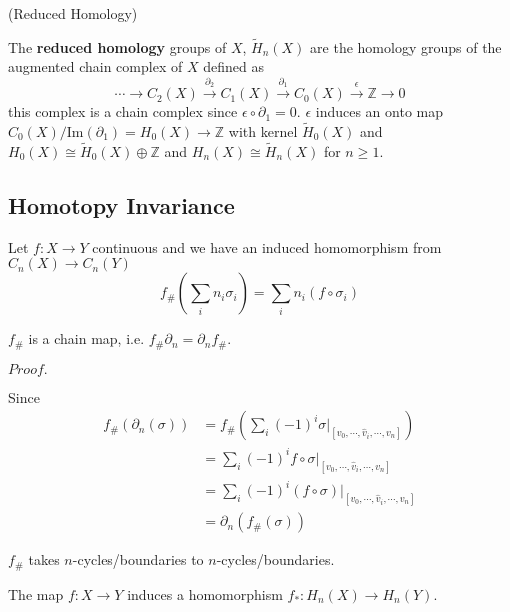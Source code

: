 \documentclass{article}
\newcommand{\Pf}[1]{$Proof.$\par}
\begin{document}
\begin{definition}(Reduced Homology)\par
    The \textbf{reduced homology} groups of $X$, $\widetilde{H}_n(X)$ are the homology groups of the augmented chain complex of $X$ defined as
    \[\cdots \rightarrow C_2(X)  \overset{\partial_2}{\rightarrow} C_1(X) \overset{\partial_1}{\rightarrow} C_0(X) \overset{\epsilon}{\rightarrow} \mathbb{Z} {\rightarrow} 0\]
    this complex is a chain complex since $\epsilon \circ \partial_1 = 0$. $\epsilon$ induces an onto map $C_0(X)/\text{Im}(\partial_1) = H_0(X) \to \mathbb{Z}$ with kernel $\widetilde{H}_0(X)$ and $H_0(X)\cong \widetilde{H}_0(X)\oplus \mathbb{Z}$ and $H_n(X)\cong\widetilde{H}_n(X)$ for $n\geq 1$.
\end{definition}

\subsection{Homotopy Invariance}

\begin{definition}
    Let $f:X\to Y$ continuous and we have an induced homomorphism from $C_n(X) \to C_n(Y)$
    \[f_{\#}(\sum\limits_i n_i\sigma_i) = \sum\limits_{i} n_i(f\circ\sigma_i)\]
\end{definition}

\begin{lemma}
    $f_{\#}$ is a chain map, i.e. $f_{\#}\partial_n = \partial_nf_{\#}$.
\end{lemma}
\Pf\par
    Since
    \[
    \begin{aligned}
        f_{\#}(\partial_n(\sigma)) &= f_{\#}\left(\sum\limits_i (-1)^i \sigma|_{[v_0,\cdots,\hat{v}_i,\cdots,v_n]}\right) \\
        &= \sum\limits_i (-1)^i f\circ \sigma|_{[v_0,\cdots,\hat{v}_i,\cdots,v_n]} \\
        &= \sum\limits_i (-1)^i (f\circ \sigma)|_{[v_0,\cdots,\hat{v}_i,\cdots,v_n]} \\
        &= \partial_n(f_{\#}(\sigma))
    \end{aligned}
    \]

\begin{corollary}
    $f_{\#}$ takes $n$-cycles/boundaries to $n$-cycles/boundaries.
\end{corollary}

\begin{corollary}
    The map $f:X\to Y$ induces a homomorphism $f_*:H_n(X) \to H_n(Y)$.
\end{corollary}
\end{document}
